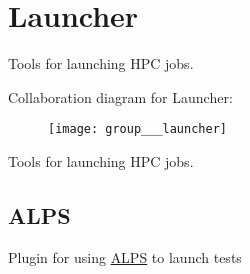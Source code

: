\hypertarget{group___launcher}{\section{Launcher}
\label{group___launcher}
}


Tools for launching H\-P\-C jobs.  


Collaboration diagram for Launcher\-:
\nopagebreak
\begin{figure}[H]
\begin{center}
\leavevmode
\texttt{[image: group\_\_\_launcher]}
\end{center}
\end{figure}
Tools for launching H\-P\-C jobs. \hypertarget{group___launcher_ALPS}{}\subsection{A\-L\-P\-S}\label{group___launcher_ALPS}
Plugin for using \hyperlink{namespace_a_l_p_s}{A\-L\-P\-S} to launch tests 
